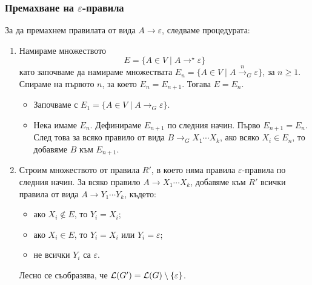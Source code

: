 \subsubsection*{Премахване на $\varepsilon$-правила}
За да премахнем правилата от вида $A \to \varepsilon$, следваме процедурата:
\begin{enumerate}[1)]
\item 
  Намираме множеството
  \[E = \{A \in V \mid A \to^\star \varepsilon\}\]
  като започваме да намираме множествата $E_n = \{A \in V \mid A \stackrel{n}{\to}_G \varepsilon \}$, за $n \geq 1$.
  Спираме на първото $n$, за което $E_n = E_{n+1}$. Тогава $E = E_n$.
  \begin{itemize}
  \item
    Започваме с $E_1 = \{A \in V \mid A \to_G \varepsilon\}$.
  \item
    Нека имаме $E_n$. Дефинираме $E_{n+1}$ по следния начин.
    Първо $E_{n+1} = E_n$. След това за всяко правило от вида $B \to_G X_1\cdots X_k$, 
    ако всяко $X_i \in E_n$, то добавяме $B$ към $E_{n+1}$.
  \end{itemize}
\item
  Строим множеството от правила $R'$, в което няма правила $\varepsilon$-правила по следния начин.
  За всяко правило $A \to X_1\cdots X_k$,
  добавяме към $R'$ всички правила от вида $A \to Y_1\cdots Y_k$, където:
  \begin{itemize}[-]
  \item 
    ако $X_i \not\in E$, то $Y_i = X_i$;
  \item
    ако $X_i \in E$, то $Y_i = X_i$ или $Y_i = \varepsilon$;
  \item
    не всички $Y_i$ са $\varepsilon$.
  \end{itemize}
  Лесно се съобразява, че $\mathcal{L}(G') = \mathcal{L}(G) \setminus \{\varepsilon\}$.
\end{enumerate}

